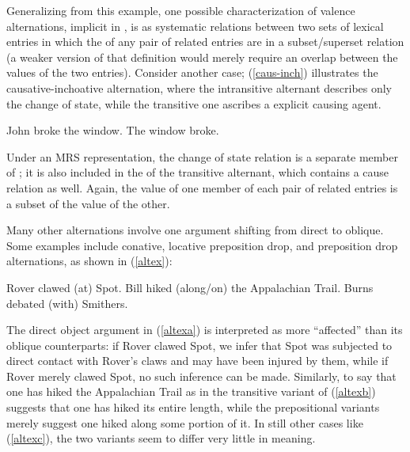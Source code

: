 \documentclass[output=paper
 	        ,biblatex
                ,babelshorthands
                ,newtxmath
                ,draftmode
                ,colorlinks, citecolor=brown
]{langscibook}
\begin{document}
Generalizing from this example, one possible characterization of valence alternations, implicit in \citet{KoenigandDavis2006}, is as systematic relations between two sets of lexical entries in which the \rels of any pair of related entries are in a subset/superset relation (a weaker version of that definition would merely require an overlap between the \rels values of the two entries). 
Consider another case; (\ref{caus-inch}) illustrates the causative-inchoative alternation, where the intransitive alternant describes only the change of state, while the transitive one ascribes a explicit causing agent.

\begin{exe}
\ex\label{caus-inch}
\begin{xlist}
	\ex\label{caus-inch-a}John broke the window.
	\ex\label{caus-inch-b}The window broke.
\end{xlist}	
\end{exe}

\noindent
Under an MRS representation, the change of state relation is a separate member of \rels; it is also included in the \rels of the transitive alternant, which contains a cause relation as well.
Again, the \rels value of one member of each pair of related entries is a subset of the \rels value of the other.

Many other alternations involve one argument shifting from direct to oblique.
Some  examples include conative, locative preposition drop, and  preposition drop alternations, as shown in (\ref{altex}):

\begin{exe}\ex\label{altex}
\begin{xlist}
\ex \label{altexa} Rover clawed (at) Spot. 
\ex \label{altexb} Bill hiked (along/on) the Appalachian Trail.
\ex \label{altexc} Burns debated (with) Smithers.
\end{xlist}
\end{exe}

\noindent
The direct object argument in (\ref{altexa}) is interpreted as more ``affected'' than its oblique counterparts:  if Rover clawed Spot, we infer that Spot was subjected to direct contact with Rover's claws and may have been injured by them, while if Rover merely clawed  Spot, no such inference can be made.
Similarly, to say that one has hiked the Appalachian Trail as in the transitive variant of (\ref{altexb}) suggests that one has hiked its entire length, while the prepositional variants merely suggest one hiked along some portion of it.  In still other cases like (\ref{altexc}), the two variants seem to differ very little in meaning.  
\end{document}
